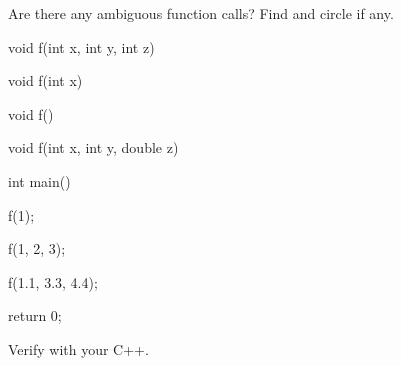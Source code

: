 Are there any ambiguous function calls? Find and circle if any.



\begin{consolethree}[escapeinside=||]

void f(int x, int y, int z)

{}



void f(int x)

{}



void f()

{}



void f(int x, int y, double z)

{}



int main()

{

    f(1);

    f(1, 2, 3);

    f(1.1, 3.3, 4.4);

    return 0;

}

\end{consolethree}



Verify with your C++.


